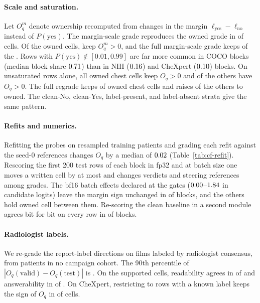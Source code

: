 

\paragraph{Scale and saturation.} Let $O^m_q$ denote ownership recomputed from changes in the margin $\ell_{\mathrm{yes}}-\ell_{\mathrm{no}}$ instead of $P(\mathrm{yes})$. The margin-scale grade reproduces the owned grade in \cfScaleAgree{} of \cfScaleAgreeN{} cells. Of the \cfScaleOwned{} owned cells, \cfScaleOwnedMpos{} keep $O^m_q>0$, and the full margin-scale grade keeps \cfScaleOwnedKeepFull{} of the \cfScaleOwned{}. Rows with $P(\mathrm{yes})\notin[0.01,0.99]$ are far more common in COCO blocks (median block share $0.71$) than in NIH ($0.16$) and CheXpert ($0.10$) blocks. On unsaturated rows alone, all \cfScaleUnsatOwned{} owned chest cells keep $O_q>0$ and \cfScaleUnsatOtherPos{} of the \cfScaleUnsatOther{} others have $O_q>0$. The full regrade keeps \cfScaleUnsatGradeKept{} of \cfScaleUnsatGradeN{} owned chest cells and raises \cfScaleUnsatGradeGained{} of the \cfScaleUnsatGradeOtherN{} others to owned. The clean-No, clean-Yes, label-present, and label-absent strata give the same pattern.

\paragraph{Refits and numerics.} Refitting the probes on resampled training patients and grading each refit against the seed-0 references changes $O_q$ by a median of $0.02$ (Table~\ref{tab:cf-refit}). Rescoring the first 200 test rows of each block in fp32 and at batch size one moves a written cell by at most \cfPrecisionMaxDW{} and changes \cfPrecisionVerdictChanges{} verdicts and \cfPrecisionRefChanges{} steering references among \cfPrecisionGradeCells{} grades. The bf16 batch effects declared at the gates ($0.00$--$1.84$ in candidate logits) leave the margin sign unchanged in \cfScaleBatchAgree{} of \cfScaleBatchN{} blocks, and the \cfScaleBatchDisagree{} others hold \cfScaleBatchDisagreeOwned{} owned cell between them. Re-scoring the clean baseline in a second module agrees bit for bit on every row in \cfScaleBaselineIdentical{} of \cfScaleBaselineN{} blocks.



\paragraph{Radiologist labels.} We re-grade the report-label directions on \cfValidRows{} films labeled by radiologist consensus, from patients in no campaign cohort. The 90th percentile of $|O_q(\text{valid})-O_q(\text{test})|$ is \cfValidNinetyDO{}. On the \cfValidSupported{} supported cells, readability agrees in \cfValidReadableAgree{} of \cfValidReadableN{} and answerability in \cfValidAnswerAgree{} of \cfValidAnswerN{}. On CheXpert, restricting to rows with a known label keeps the sign of $O_q$ in \cfValKnownSignAgree{} of \cfValKnownN{} cells.

